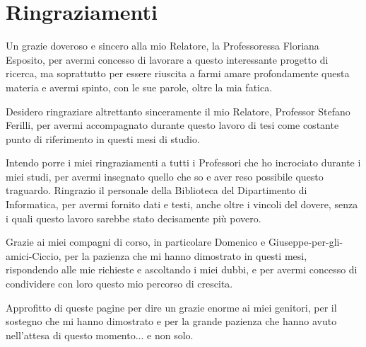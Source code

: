 \chapter*{Ringraziamenti}
\rhead{}

Un grazie doveroso e sincero alla mio Relatore, la Professoressa Floriana Esposito, per avermi concesso di lavorare a questo interessante progetto di ricerca, ma soprattutto per essere riuscita a farmi amare profondamente questa materia e avermi spinto, con le sue parole, oltre la mia fatica. 

Desidero ringraziare altrettanto sinceramente il mio Relatore, Professor Stefano Ferilli, per avermi accompagnato durante questo lavoro di tesi come costante punto di riferimento in questi mesi di studio.

Intendo porre i miei ringraziamenti a tutti i Professori che ho incrociato durante i miei studi, per avermi insegnato quello che so e aver reso possibile questo traguardo. Ringrazio il personale della Biblioteca del Dipartimento di Informatica, per avermi fornito dati e testi, anche oltre i vincoli del dovere, senza i quali questo lavoro sarebbe stato decisamente più povero.

Grazie ai miei compagni di corso, in particolare Domenico e Giuseppe-per-gli-amici-Ciccio, per la pazienza che mi hanno dimostrato in questi mesi, rispondendo alle mie richieste e ascoltando i miei dubbi, e per avermi concesso di condividere con loro questo mio percorso di crescita.

Approfitto di queste pagine per dire un grazie enorme ai miei genitori, per il sostegno che mi hanno dimostrato e per la grande pazienza che hanno avuto nell'attesa di questo momento... e non solo.

